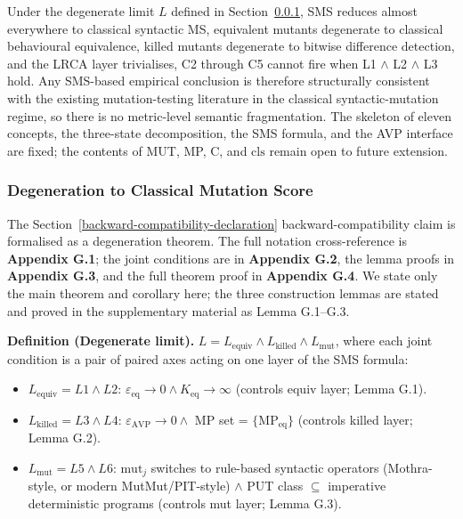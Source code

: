 \documentclass[manuscript,screen,review]{acmart}
\begin{document}
Under the degenerate limit $L$ defined in Section~\ref{sms-ms-degeneration-formal-statement}, SMS reduces
almost everywhere to classical syntactic MS, equivalent mutants
degenerate to classical behavioural equivalence, killed mutants
degenerate to bitwise difference detection, and the LRCA layer
trivialises, C2 through C5 cannot fire when L1 $\wedge$ L2 $\wedge$ L3 hold. Any
SMS-based empirical conclusion is therefore structurally consistent with
the existing mutation-testing literature in the classical
syntactic-mutation regime, so there is no metric-level semantic
fragmentation. The skeleton of eleven concepts, the three-state
decomposition, the SMS formula, and the AVP interface are fixed; the
contents of MUT, MP, C, and $\mathrm{cls}$ remain open to future
extension.

\subsubsection{Degeneration to Classical Mutation Score}\label{sms-ms-degeneration-formal-statement}

The Section~\ref{backward-compatibility-declaration} backward-compatibility claim is formalised as a degeneration
theorem. The full notation cross-reference is \textbf{Appendix G.1}; the joint
conditions are in \textbf{Appendix G.2}, the lemma proofs in
\textbf{Appendix G.3}, and the full theorem proof in \textbf{Appendix G.4}. We
state only the main theorem and corollary here; the three construction
lemmas are stated and proved in the supplementary material as
Lemma G.1--G.3.

\textbf{Definition (Degenerate limit).}
$L = L_{\mathrm{equiv}} \wedge L_{\mathrm{killed}} \wedge L_{\mathrm{mut}}$, where each joint
condition is a pair of paired axes acting on one layer of the SMS
formula:

\begin{itemize}

\item
  $L_{\mathrm{equiv}} = L1 \wedge L2$: $\varepsilon_{\mathrm{eq}} \to 0 \wedge K_{\mathrm{eq}} \to \infty$ (controls equiv
  layer; Lemma G.1).
\item
  $L_{\mathrm{killed}} = L3 \wedge L4$: $\varepsilon_{\mathrm{AVP}} \to 0 \wedge$ MP set = $\{\mathrm{MP}_{\mathrm{eq}}\}$
  (controls killed layer; Lemma G.2).
\item
  $L_{\mathrm{mut}} = L5 \wedge L6$: $\mathrm{mut}_j$ switches to rule-based syntactic
  operators (Mothra-style, or modern MutMut/PIT-style) $\wedge$ PUT class $\subseteq$ imperative deterministic
  programs (controls mut layer; Lemma G.3).
\end{itemize}
\end{document}
